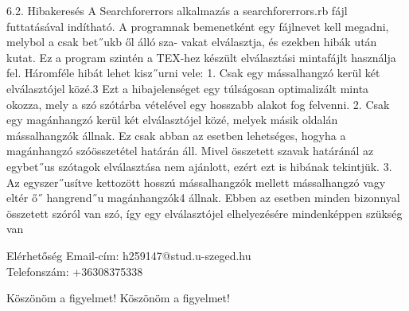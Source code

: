 \documentclass[11pt]{beamer}
\begin{document}
    \begin{frame}
        6.2. Hibakeresés
        A Searchforerrors alkalmazás a searchforerrors.rb fájl futtatásával indítható. A
        programnak bemenetként egy fájlnevet kell megadni, melybol a csak bet˝ukb ől álló sza-
        vakat elválasztja, és ezekben hibák után kutat. Ez a program szintén a TEX-hez készült
        elválasztási mintafájlt használja fel.
        Háromféle hibát lehet kisz˝urni vele:
        1. Csak egy mássalhangzó kerül két elválasztójel közé.3 Ezt a hibajelenséget egy túlságosan optimalizált minta okozza, mely a szó szótárba vételével egy hosszabb alakot
        fog felvenni.
        2. Csak egy magánhangzó kerül két elválasztójel közé, melyek másik oldalán mássalhangzók állnak. Ez csak abban az esetben lehetséges, hogyha a magánhangzó szóösszetétel határán áll. Mivel összetett szavak határánál az egybet˝us szótagok elválasztása nem ajánlott, ezért ezt is hibának tekintjük.
        3. Az egyszer˝usítve kettozött hosszú mássalhangzók mellett mássalhangzó vagy eltér ő˝
        hangrend˝u magánhangzók4
        állnak. Ebben az esetben minden bizonnyal összetett szóról van szó, így egy elválasztójel elhelyezésére mindenképpen szükség van
    \end{frame}

    \begin{frame}{Elérhetőség}
        Email-cím: {h259147@stud.u-szeged.hu} \\
        Telefonszám: {+36308375338}
    \end{frame}

    \begin{frame}{Köszönöm a figyelmet!}
        Köszönöm a figyelmet!
    \end{frame}
\end{document}
